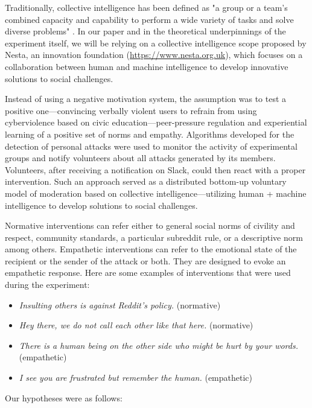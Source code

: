 \documentclass[preprint,12pt]{elsarticle}
\begin{document}
Traditionally, collective intelligence has been defined as "a group or a team's combined capacity and capability to perform a wide variety of tasks and solve diverse problems" \citep{woolley2015collective}. In our paper and in the theoretical underpinnings of the experiment itself, we will be relying on a collective intelligence scope proposed by Nesta, an innovation foundation (\url{https://www.nesta.org.uk}), which focuses on a collaboration between human and machine intelligence to develop innovative solutions to social challenges.


Instead of using a negative motivation system, the assumption was to test a positive one—convincing verbally violent users to refrain from using cyberviolence based on civic education—peer-pressure regulation and experiential learning of a positive set of norms and empathy. Algorithms developed for the detection of personal attacks were used to monitor the activity of experimental groups and notify volunteers about all attacks generated by its members. Volunteers, after receiving a notification on Slack, could then react with a proper intervention. Such an approach served as a distributed bottom-up voluntary model of moderation based on collective intelligence—utilizing human + machine intelligence to develop solutions to social challenges.



Normative interventions can refer either to general social norms of civility and respect, community standards, a particular subreddit rule, or a descriptive norm among others. Empathetic interventions can refer to the emotional state of the recipient or the sender of the attack or both. They are designed to evoke an empathetic response. Here are some examples of interventions that were used during the experiment: 
\begin{itemize}
  \item \emph{Insulting others is against Reddit's policy.} (normative)
  \item \emph{Hey there, we do not call each other like that here.} (normative)
  \item \emph{There is a human being on the other side who might be hurt by your words.} (empathetic)
  \item \emph{I see you are frustrated but remember the human.} (empathetic)
\end{itemize}

Our hypotheses were as follows: 

\vspace{2mm}
\end{document}
